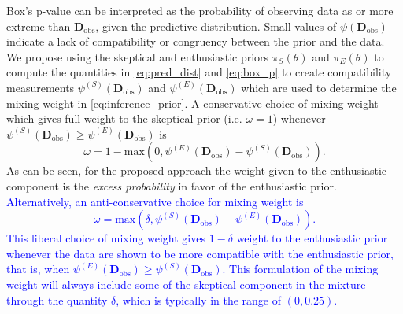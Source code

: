 \documentclass[AMA,STIX1COL,doublespace]{WileyNJD-v2}
\begin{document}
Box's p-value can be interpreted as the probability of observing data as or more extreme than $\mathbf{D}_{\text{obs}}$, given the predictive distribution. 
%
Small values of $\psi({\mathbf{D}_{\text{obs}}})$ indicate a lack of compatibility or congruency between the prior and the data. 
%
We propose using the skeptical and enthusiastic priors $\pi_S(\theta)$ and $\pi_E(\theta)$ to compute the quantities in \eqref{eq:pred_dist} and \eqref{eq:box_p} to create compatibility measurements $\psi^{(S)}(\mathbf{D}_{\text{obs}})$ and $\psi^{(E)}(\mathbf{D}_{\text{obs}})$ which are used to determine the mixing weight in \eqref{eq:inference_prior}. 
%
A conservative choice of mixing weight which gives full weight to the skeptical prior (i.e. $\omega=1$) whenever $\psi^{(S)}(\mathbf{D}_{\text{obs}})\geq \psi^{(E)}(\mathbf{D}_{\text{obs}})$ is
\begin{equation}\label{eq:adaptive_prior}
\omega = 1 - \text{max}\left(0, \psi^{(E)}(\mathbf{D}_{\text{obs}})-\psi^{(S)}(\mathbf{D}_{\text{obs}})\right).
\end{equation}
%
As can be seen, for the proposed approach the weight given to the enthusiastic component is the \textit{excess probability} in favor of the enthusiastic prior. \textcolor{blue}{Alternatively, an anti-conservative choice for mixing weight is
\begin{equation}\label{eq:adaptive_prior_delta}
\omega=\text{max}\left(\delta, \psi^{(S)}(\mathbf{D}_{\text{obs}})-\psi^{(E)}(\mathbf{D}_{\text{obs}})\right).
\end{equation}
This liberal choice of mixing weight gives $1 - \delta$ weight to the enthusiastic prior whenever the data are shown to be more compatible with the enthusiastic prior, that is, when $\psi^{(E)}(\mathbf{D}_{\text{obs}})\geq \psi^{(S)}(\mathbf{D}_{\text{obs}})$. This formulation of the mixing weight will always include some of the skeptical component in the mixture through the quantity $\delta$, which is typically in the range of $(0, 0.25)$.}
%
\end{document}
